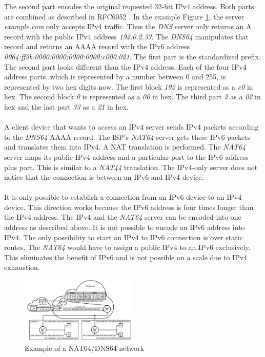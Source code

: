 \documentclass[format=sigconf, natbib=true, nonacm=true]{acmart}
\begin{document}
    The second part encodes the original requested 32-bit IPv4 address. Both parts are combined as described in RFC6052 \cite{rfc6052}. In the example Figure \ref{fig:nat_64_dns_64}, the server \textit{example.com} only accepts IPv4 traffic. Thus the \textit{DNS} server only returns an A record with the public IPv4 address \textit{192.0.2.33}. The \textit{DNS64} manipulates that record and returns an AAAA record with the IPv6 address \textit{0064:ff9b:0000:0000:0000:0000:c000:021}. The first part is the standardized prefix. The second part looks different than the IPv4 address. Each of the four IPv4 address parts, which is represented by a number between 0 and 255, is represented by two hex digits now. The first block \textit{192} is represented as a \textit{c0} in hex. The second block \textit{0} is represented as a \textit{00} in hex. The third part \textit{2} as a \textit{02} in hex and the last part \textit{33} as a \textit{21} in hex\cite{rfc6052}.\\\\A client device that wants to access an IPv4 server sends IPv4 packets according to the \textit{DNS64} AAAA record. The ISP's \textit{NAT64} server gets these IPv6 packets and translates them into IPv4. A NAT translation is performed. The \textit{NAT64} server maps its public IPv4 address and a particular port to the IPv6 address plus port. This is similar to a \textit{NAT44} translation. The IPv4-only server does not notice that the connection is between an IPv6 and IPv4 device.\\\\It is only possible to establish a connection from an IPv6 device to an IPv4 device. This direction works because the IPv6 address is four times longer than the IPv4 address. The IPv4 and the \textit{NAT64} server can be encoded into one address as described above. It is not possible to encode an IPv6 address into IPv4. The only possibility to start an IPv4 to IPv6 connection is over static routes. The \textit{NAT64} would have to assign a public IPv4 to an IPv6 exclusively. This eliminates the benefit of IPv6 and is not possible on a scale due to IPv4 exhaustion\cite{rfc6146}.
    \begin{figure}
        \centering
        \includegraphics[width=0.5\textwidth]{images/nat_64_dns_64.png}
        \caption{Example of a NAT64/DNS64 network}
        \label{fig:nat_64_dns_64}
    \end{figure}
\end{document}
